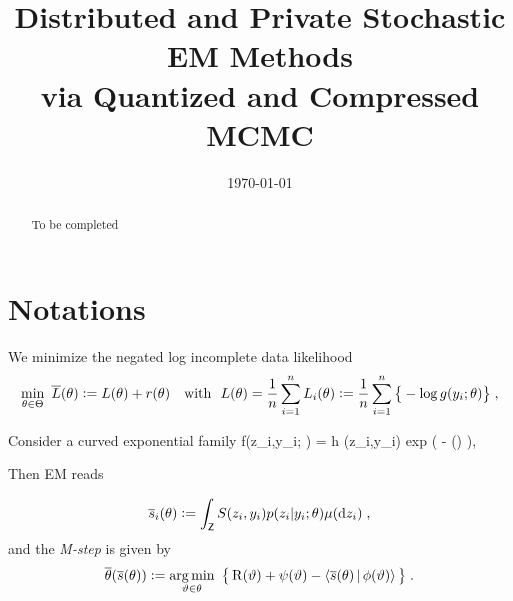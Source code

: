 \documentclass[11pt]{article}
\theoremstyle{t}
\begin{document}
\title{Distributed and Private Stochastic EM Methods\\
via Quantized and Compressed MCMC}
\date{\today}

\maketitle

\begin{abstract}
To be completed
\end{abstract}


\section{Notations}

We minimize the negated log incomplete data likelihood 
\begin{align} \label{eq:em_motivate}
\begin{split} 
 \min_{ \theta \in \Theta }~ \overline{L} ( \theta ) \mathrel{\mathop:}=  L ( \theta ) + r (\theta) \quad \text{with}~~L(\theta) = \frac{1}{n} \sum_{i=1}^n L_i( \theta) \mathrel{\mathop:}=  \frac{1}{n} \sum_{i=1}^n \big\{ - \log g( y_i ; \theta ) \big\}\;,
\end{split} 
\end{align}


Consider a curved exponential family
\beq \label{eq:exp}
f(z_i,y_i; \theta) = h  (z_i,y_i) \textrm{exp} (  - \psi(\theta) )\eqs,
\eeq

Then EM reads

\begin{align}\label{eq:definition-overline-bss}
\overline{s}_i(\theta) \mathrel{\mathop:}= \int_{\mathsf{Z}} S(z_i,y_i) p(z_i|y_i;\theta) \mu(\mathrm d z_i) \;,
\end{align}
and the \textit{M-step} is given by
\begin{align}\label{eq:mstep}
\overline{\theta}( \overline{s}(\theta) ) \mathrel{\mathop:}= \mathop{\mathrm{arg\,min}}_{ \vartheta \in \theta } ~\big\{ \operatorname{R}( \vartheta ) + \psi( \vartheta) - \left\langle \overline{s}(\theta)\,|\, \phi ( \vartheta)  \right\rangle \big\} \;.
\end{align}
\end{document}
